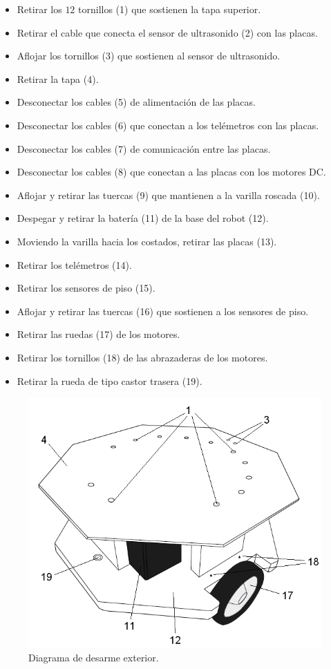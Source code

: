 \begin{itemize}
 \item Retirar los $12$ tornillos (1) que sostienen la tapa superior.
 \item Retirar el cable que conecta el sensor de ultrasonido (2) con las placas.
 \item Aflojar los tornillos (3) que sostienen al sensor de ultrasonido.
 \item Retirar la tapa (4).
 \item Desconectar los cables (5) de alimentaci\'on de las placas.
 \item Desconectar los cables (6) que conectan a los tel\'emetros con las placas.
 \item Desconectar los cables (7) de comunicaci\'on entre las placas.
 \item Desconectar los cables (8) que conectan a las placas con los motores DC.
 \item Aflojar y retirar las tuercas (9) que mantienen a la varilla roscada (10).
 \item Despegar y retirar la bater\'ia (11) de la base del robot (12).
 \item Moviendo la varilla hacia los costados, retirar las placas (13).
 \item Retirar los tel\'emetros (14).
 \item Retirar los sensores de piso (15).
 \item Aflojar y retirar las tuercas (16) que sostienen a los sensores de piso.
 \item Retirar las ruedas (17) de los motores.
 \item Retirar los tornillos (18) de las abrazaderas de los motores.
 \item Retirar la rueda de tipo castor trasera (19).
\end{itemize}

\begin{figure}
	\centering
	\includegraphics[scale=.45]{figuras/desarme_1.png}
	\caption{Diagrama de desarme exterior.}
	\label{hF_desarme_1}
\end{figure}

